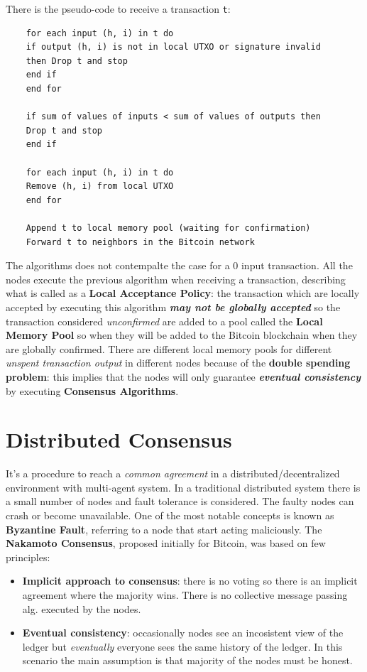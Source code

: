 \documentclass[10pt,a4paper]{report}
\begin{document}
There is the pseudo-code to receive a transaction \texttt{t}:
\begin{verbatim}
	for each input (h, i) in t do 
	if output (h, i) is not in local UTXO or signature invalid 
	then Drop t and stop 
	end if 
	end for 
	
	if sum of values of inputs < sum of values of outputs then 
	Drop t and stop 
	end if 
	
	for each input (h, i) in t do 
	Remove (h, i) from local UTXO 
	end for 
	
	Append t to local memory pool (waiting for confirmation) 
	Forward t to neighbors in the Bitcoin network
\end{verbatim}

The algorithms does not contempalte the case for a 0 input transaction.
All the nodes execute the previous algorithm when receiving a transaction, describing what is called as a \textbf{Local Acceptance Policy}: the transaction which are locally accepted by executing this algorithm \textit{\textbf{may not be globally accepted}} so the transaction considered \textit{unconfirmed} are added to a pool called the \textbf{Local Memory Pool} so when they will be added to the Bitcoin blockchain when they are globally confirmed.
There are different local memory pools for different \textit{unspent transaction output} in different nodes because of the \textbf{double spending problem}: this implies that the nodes will only guarantee \textit{\textbf{eventual consistency}} by executing \textbf{Consensus Algorithms}.
\section{Distributed Consensus}\label{sec:distributed-consensus}
It's a procedure to reach a \textit{common agreement} in a distributed/decentralized environment with multi-agent system.
In a traditional distributed system there is a small number of nodes and fault tolerance is considered. The faulty nodes can crash or become unavailable.
One of the most notable concepts is known as \textbf{Byzantine Fault}, referring to a node that start acting maliciously.
The \textbf{Nakamoto Consensus}, proposed initially for Bitcoin, was based on few principles:
\begin{itemize}
	\item 
	\textbf{Implicit approach to consensus}: there is no voting so there is an implicit agreement where the majority wins. There is no collective message passing alg. executed by the nodes.
	\item 
	\textbf{Eventual consistency}: occasionally nodes see an incosistent view of the ledger but \textit{eventually} everyone sees the same history of the ledger. In this scenario the main assumption is that majority of the nodes must be honest.
\end{itemize}
\end{document}
